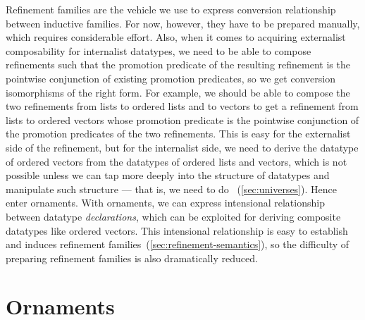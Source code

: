 
Refinement families are the vehicle we use to express conversion relationship between inductive families.
For now, however, they have to be prepared manually, which requires considerable effort.
Also, when it comes to acquiring externalist composability for internalist datatypes, we need to be able to compose refinements such that the promotion predicate of the resulting refinement is the pointwise conjunction of existing promotion predicates, so we get conversion isomorphisms of the right form.
For example, we should be able to compose the two refinements from lists to ordered lists and to vectors to get a refinement from lists to ordered vectors whose promotion predicate is the pointwise conjunction of the promotion predicates of the two refinements.
This is easy for the externalist side of the refinement, but for the internalist side, we need to derive the datatype of ordered vectors from the datatypes of ordered lists and vectors, which is not possible unless we can tap more deeply into the structure of datatypes and manipulate such structure --- that is, we need to do ~(\autoref{sec:universes}).
Hence enter ornaments.
With ornaments, we can express intensional relationship between datatype \emph{declarations}, which can be exploited for deriving composite datatypes like ordered vectors.
This intensional relationship is easy to establish and induces refinement families~(\autoref{sec:refinement-semantics}), so the difficulty of preparing refinement families is also dramatically reduced.

\section{Ornaments}
\label{sec:ornaments}


